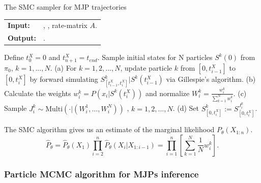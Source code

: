 \begin{algorithm}[H]
  \caption{The SMC sampler for MJP trajectories}
   \label{alg:SMC}
  \begin{tabular}{l l}
   \textbf{Input:  } & \text{Prior $\pi_0$, $n$ observations $X$}, 
                       \text{Number of particles $N$}, rate-matrix $A$.\\
   \textbf{Output:  }& \text{New MJP trajectory $S' (t) = (s'_0, S', T')$}.\\
   \hline
   \end{tabular}
   \begin{algorithmic}[1]
\State Define $t^X_0 = 0$ and $t^X_{n+1} = t_{end}$. %
\State 
Sample initial states for N particles $S^k(0)$ from $\pi_0$, $k = 1,...,N$. 
	\State (a) For $k = 1,2,...,N$, update particle $k$ from $[0,t^X_{i-1}]$ to $[0,t^X_i]$ by forward simulating $S_{[t^X_{i -1},t^X_i]}^k|S^k(t^X_{i-1})$ via Gillespie's algorithm.
	\State (b) Calculate the weights $w^k_i = P(x_i|S^k(t^X_i))$
and normalize 
$W^k_i = \frac{w^k_i}{\sum_{k = 1}^N w^k_i}.$ 
	\State (c) Sample $J_{i}^k \sim \text{Multi}(\cdot| (W^1_{i},\dotsc,W^N_{i}))$ , $k = 1,2,...,N$.
	\State (d) Set $S_{[0, t^X_i]}^k := S_{[0,t^X_i]}^{J^k_i}$.
	\EndFor
\end{algorithmic}
\end{algorithm}


The SMC algorithm gives us an estimate of the marginal likelihood $P_\theta(X_{1:n})$.
$$ \hat{P}_{\theta} = \hat{P}_{\theta}(X_1) \prod_{i = 2}^n \hat{P}_{\theta}(X_i| X_{1: i- 1}) = \prod_{i = 1}^n \left[ \sum_{k = 1}^N  \frac{1}{N} w_i^k \right].$$


\subsubsection{Particle MCMC algorithm for MJPs inference}

